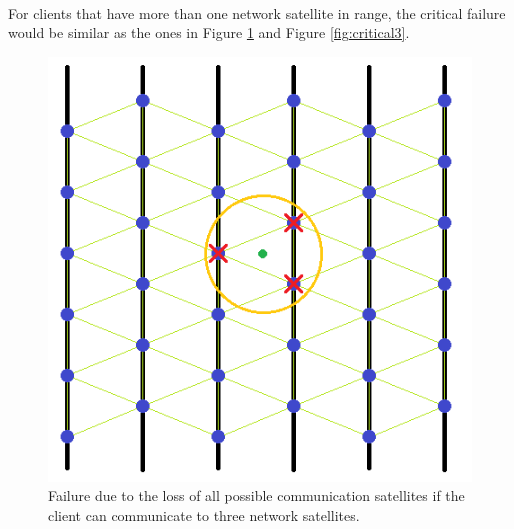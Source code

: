 \paragraph{}For clients that have more than one network satellite in range, the critical failure would be similar as the ones in Figure \ref{fig:critical2} and Figure \ref{fig:critical3}. 
\begin{figure}[H]
\begin{center}
\includegraphics[scale=0.5]{./sections/Constellation_Deployment/S5-Spare_Strategy/critical2.png}
\caption[3 communication range failure]{Failure due to the loss of all possible communication satellites if the client can communicate to three network satellites.}
\label{fig:critical2}
\end{center}
\end{figure}
